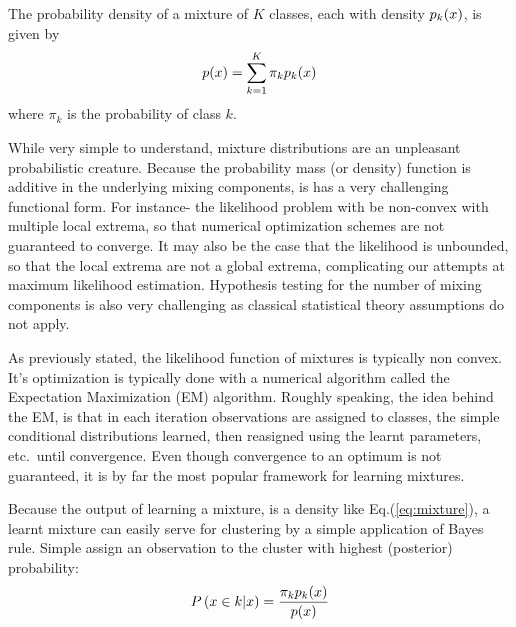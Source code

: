 The probability density of a mixture of $K$ classes, each with density $p_k(x)$, is given by  
\begin{align}
\label{eq:mixture}
	p(x)=\sum_{k=1}^{K} \pi_k p_k(x)
\end{align}
where $\pi_k$ is the probability of class $k$.



\begin{remark}
While very simple to understand, mixture distributions are an unpleasant probabilistic creature. 
Because the probability mass (or density) function is additive in the underlying mixing components, is has a very challenging functional form.
For instance- the likelihood problem with be non-convex with multiple local extrema, so that numerical optimization schemes are not guaranteed to converge.
It may also be the case that the likelihood is unbounded, so that the local extrema are not a global extrema, complicating our attempts at maximum likelihood estimation. 
Hypothesis testing for the number of mixing components is also very challenging as classical statistical theory assumptions do not apply.
\end{remark}


\begin{remark}
As previously stated, the likelihood function of mixtures is typically non convex. 
It's optimization is typically done with a numerical algorithm called the Expectation Maximization (EM) algorithm.
Roughly speaking, the idea behind the EM, is that in each iteration observations are assigned to classes, the simple conditional distributions learned, then reasigned using the learnt parameters, etc.\ until convergence.
Even though convergence to an optimum is not guaranteed, it is by far the most popular framework for learning mixtures.
\end{remark}



\begin{remark}
Because the output of learning a mixture, is a density like Eq.(\ref{eq:mixture}), a learnt mixture can easily serve for clustering by a simple application of Bayes rule. Simple assign an observation to the cluster with highest (posterior) probability:
\begin{align}
\label{eq:mixture_posterior}
	P\left( x \in k|x \right)=\frac{\pi_k p_k(x)}{p(x)}
\end{align}
\end{remark}



